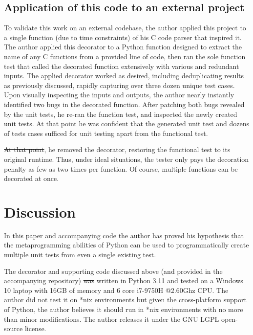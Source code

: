 \documentclass[10pt, conference]{IEEEtran}
\makeatletter
\providecommand{\DIFadd}[1]{{\protect\color{blue}\uwave{#1}}} %
\providecommand{\DIFdel}[1]{{\protect\color{red}\sout{#1}}} %
\providecommand{\DIFaddbegin}{} %
\providecommand{\DIFaddend}{} %
\providecommand{\DIFdelbegin}{} %
\providecommand{\DIFdelend}{} %
\newcommand{\DIFscaledelfig}{0.5}
\newlength{\DIFdelgraphicswidth} %
\newlength{\DIFdelgraphicsheight} %
\newcommand{\DIFaddincludegraphics}[2][]{{\color{blue}\fbox{\DIFOincludegraphics[#1]{#2}}}} %
\newcommand{\DIFdelincludegraphics}[2][]{%
\sbox{\DIFdelgraphicsbox}{\DIFOincludegraphics[#1]{#2}}%
\settoboxwidth{\DIFdelgraphicswidth}{\DIFdelgraphicsbox} %
\settoboxtotalheight{\DIFdelgraphicsheight}{\DIFdelgraphicsbox} %
\scalebox{\DIFscaledelfig}{%
\parbox[b]{\DIFdelgraphicswidth}{\usebox{\DIFdelgraphicsbox}\\[-\baselineskip] \rule{\DIFdelgraphicswidth}{0em}}\llap{\resizebox{\DIFdelgraphicswidth}{\DIFdelgraphicsheight}{%
\setlength{\unitlength}{\DIFdelgraphicswidth}%
\begin{picture}(1,1)%
\thicklines\linethickness{2pt} %
{\color[rgb]{1,0,0}\put(0,0){\framebox(1,1){}}}%
{\color[rgb]{1,0,0}\put(0,0){\line( 1,1){1}}}%
{\color[rgb]{1,0,0}\put(0,1){\line(1,-1){1}}}%
\end{picture}%
}\hspace*{3pt}}} %
} %
\DeclareRobustCommand{\DIFaddbegin}{\DIFOaddbegin \let\includegraphics\DIFaddincludegraphics} %
\DeclareRobustCommand{\DIFaddend}{\DIFOaddend \let\includegraphics\DIFOincludegraphics} %
\DeclareRobustCommand{\DIFdelbegin}{\DIFOdelbegin \let\includegraphics\DIFdelincludegraphics} %
\DeclareRobustCommand{\DIFdelend}{\DIFOaddend \let\includegraphics\DIFOincludegraphics} %
\let\sout@orig\sout %
\renewcommand{\sout}[1]{\ifmmode\text{\sout@orig{\ensuremath{#1}}}\else\sout@orig{#1}\fi} %
\makeatother
\begin{document}
\subsection{Application of this code to an external project}\label{sec:eval-2}
To validate this work on an external codebase, the author applied 
this project to a single function (due to time constraints) of his C code
parser that inspired it.  The author applied this
decorator to a Python function designed to extract the name of any C functions 
from a provided line of code, then ran the sole function test that called 
the decorated function extensively with various and redundant inputs.
The applied decorator worked as desired, including deduplicating results as
previously discussed, rapidly capturing over three dozen unique test cases.
Upon visually inspecting the inputs and outputs, the author 
nearly instantly identified two bugs in the decorated function.
After patching both bugs revealed by the unit tests, he re-ran the function test, 
and inspected the newly created unit tests. At that point he was confident that
the generated unit test and dozens of tests cases sufficed for unit testing apart 
from the functional test.

\DIFdelbegin \DIFdel{At that point}\DIFdelend \DIFaddbegin \DIFadd{Satisfied}\DIFaddend , he removed the decorator, restoring the functional test to its 
original runtime. Thus, under ideal situations, the tester only pays the 
decoration penalty as few as two times per function.  Of course, multiple 
functions can be decorated at once.
 \section{Discussion}\label{sec:discussion}


In this paper and accompanying code the author
has proved his hypothesis that the metaprogramming abilities of 
Python can be used to programmatically create multiple 
unit tests from even a single existing test.

The decorator and supporting code discussed above
(and provided in the accompanying repository)
\DIFdelbegin \DIFdel{was }\DIFdelend \DIFaddbegin \DIFadd{were }\DIFaddend written in Python 3.11 and tested on a 
Windows 10 laptop with 16GB of memory and 6 core i7-9750H @2.60Ghz CPU.
The author did not test it on *nix environments but given the
cross-platform support of Python, the author believes it should run in *nix 
environments with no more than minor modifications. The author releases it
under the GNU LGPL open-source license.
\end{document}
